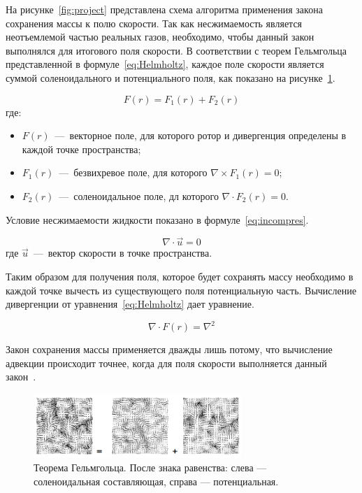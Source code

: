 На рисунке~\ref{fig:project} представлена схема алгоритма применения закона сохранения массы к полю скорости. Так как несжимаемость является неотъемлемой частью реальных газов, необходимо, чтобы данный закон выполнялся для итогового поля скорости. В соответствии с теорем Гельмгольца представленной в формуле~\ref{eq:Helmholtz}, каждое поле скорости является суммой соленоидального и потенциального поля, как показано на рисунке~\ref{fig:hodge}. 

\begin{equation}
	\label{eq:Helmholtz}
	F(r) = F_1(r)+F_2(r)
\end{equation}
где:
\begin{itemize}
	\item $F(r)$~---~векторное поле, для которого ротор и дивергенция определены в каждой точке пространства;
	\item $F_1(r)$~---~безвихревое поле, для которого $\nabla \times F_1(r) =0$;
	\item $F_2(r)$~---~соленоидальное поле, дл которого $\nabla \cdot F_2(r)=0$.
\end{itemize}

Условие несжимаемости жидкости показано в формуле~\ref{eq:incompres}.

\begin{equation}
	\label{eq:incompres}
	\nabla \cdot \vec{u} = 0
\end{equation}
где $\vec{u}$~---~вектор скорости в точке пространства.

Таким образом для получения поля, которое будет сохранять массу необходимо в каждой точке вычесть из существующего поля потенциальную часть. Вычисление дивергенции от уравнения~\ref{eq:Helmholtz} дает уравнение.

\begin{equation}
	\nabla \cdot F(r) = \nabla ^ 2 
\end{equation}

Закон сохранения массы применяется дважды лишь потому, что вычисление адвекции происходит точнее, когда для поля скорости выполняется данный закон~\cite{stam}.

\begin{figure}[H]
	\centering
	\includegraphics[width=0.7\textwidth,page=1]{assets/img/hodge.png}
	\caption{Теорема Гельмгольца. После знака равенства: слева --- соленоидальная составляющая, справа --- потенциальная.}
	\label{fig:hodge}
\end{figure}


